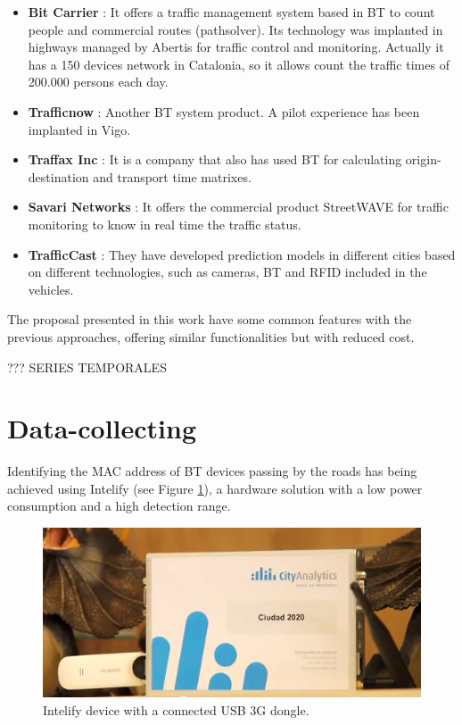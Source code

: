 \documentclass[preprint,authoryear,12pt]{elsarticle}
\begin{document}
\begin{itemize}

\item \textbf{Bit Carrier} \cite{patenteBC} \cite{BitCarrier}: It offers a traffic management system based in BT to count people and commercial routes (pathsolver). Its technology was implanted in highways managed by Abertis for traffic control and monitoring. Actually it has a 150 devices network in Catalonia, so it allows count the traffic times of 200.000 persons each day.
 
\item \textbf{Trafficnow} \cite{Trafficnow}: Another BT system product. A pilot experience has been implanted in Vigo.

 \item \textbf{Traffax Inc} \cite{TraffaxInc}: It is a company that also has used BT for calculating origin-destination and transport time matrixes.

 \item \textbf{Savari Networks} \cite{SavariNetworks}: It offers the commercial product StreetWAVE for traffic monitoring to know in real time the traffic status.


 \item \textbf{TrafficCast} \cite{TrafficCast}: They have developed prediction models in different cities based on different technologies, such as cameras, BT and RFID included in the vehicles.

\end{itemize}

The proposal presented in this work have some common features with the previous approaches, offering similar functionalities but with reduced cost.


??? SERIES TEMPORALES
\section{Data-collecting}
\label{sec:data}

Identifying the MAC address of BT devices passing by the roads has being achieved using Intelify (see Figure \ref{intelify}), a hardware solution with a low power consumption and a high detection range.

\begin{figure}[htpb] 
\begin{center} 
\includegraphics[scale=0.5]{intelifychisme1.png}
\end{center} 
\caption{Intelify device with a connected USB 3G dongle.} 
\label{intelify} 
\end{figure}
\end{document}
